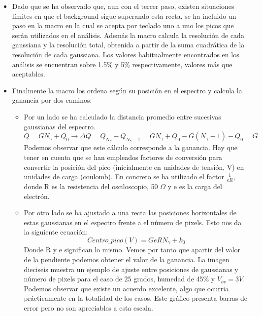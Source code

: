 \documentclass[11pt, a4paper]{article}
\begin{document}
\begin{itemize}
\item {} Dado que se ha observado que, aun con el tercer paso, existen situaciones límites en que el background sigue superando esta recta, se ha incluido un paso en la macro en la cual se acepta por teclado uno a uno los picos que serán utilizados en el análisis. Además la macro calcula la resolución de cada gaussiana y la resolución total, obtenida a partir de la suma cuadrática de la resolución de cada gaussiana. Los valores habitualmente encontrados en los análisis se encuentran sobre 1.5\% y 5\% respectivamente, valores más que aceptables.

\item {} Finalmente la macro los ordena según su posición en el espectro y calcula la ganancia por dos caminos:
	\begin{itemize}

	\item {} Por un lado se ha calculado la distancia promedio entre sucesivas gaussianas del espectro. 
	$$Q = G N_\gamma + Q_0 \longrightarrow \Delta Q= Q_{N_\gamma} - Q_{N_\gamma -1}=G N_\gamma+ Q_0 - G(N_		\gamma -1) - Q_0 = G$$
	Podemos observar que este cálculo corresponde a la ganancia. Hay que tener en cuenta que se han 			empleados factores de conversión para convertir la posición del pico (inicialmente en unidades de			tensión, V) en unidades de carga (coulomb). En concreto se ha utilizado el factor $\frac{1}{eR}$, 			donde R es la resistencia del osciloscopio, 50 $\Omega$ y e es la carga del electrón.
	
	\item {} Por otro lado se ha ajustado a una recta las posiciones horizontales de estas gaussianas en el 	espectro frente a el número de pixels. Esto nos da la siguiente ecuación:
	$$Centro\_pico(V) = GeRN_\gamma + k_0$$	
	Donde R y e significan lo mismo. Vemos por tanto que apartir del valor de la pendiente podemos obtener 		el valor de la ganancia. La imagen dieciseis muestra un ejemplo de ajuste entre posiciones de 				gaussianas y número de pixels para el caso de 25 grados, humedad de 45\% y $V_{ov}=3V$. Podemos 			observar que existe	un acuerdo excelente, algo que ocurria prácticamente en la totalidad de los casos. 		Este gráfico presenta barras de error pero no son apreciables a esta escala.
		

\end{itemize}
\end{itemize}
\end{document}
